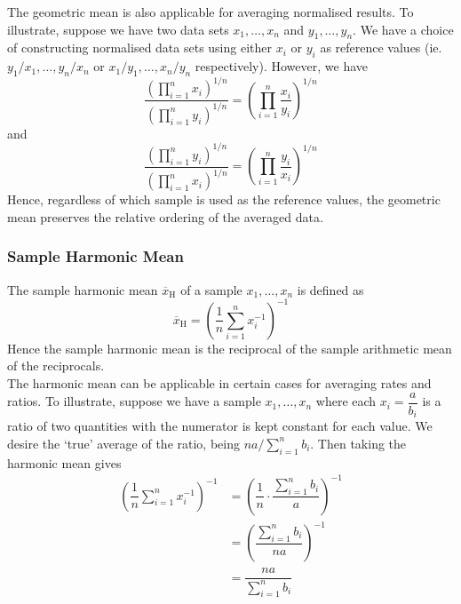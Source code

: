 \documentclass[11pt]{report} %
\begin{document}
The geometric mean is also applicable for averaging normalised results. To illustrate, suppose we have two data sets $x_{1}, \dots, x_{n}$ and $y_{1}, \dots, y_{n}$. We have a choice of constructing normalised data sets using either $x_{i}$ or $y_{i}$ as reference values (ie. $y_{1}/x_{1}, \dots, y_{n}/x_{n}$ or $x_{1}/y_{1}, \dots, x_{n}/y_{n}$ respectively). However, we have
\begin{equation}
\dfrac{\left(\prod_{i = 1}^{n}x_{i}\right)^{1/n}}{\left(\prod_{i = 1}^{n}y_{i}\right)^{1/n}} = \left(\prod_{i = 1}^{n}\dfrac{x_{i}}{y_{i}}\right)^{1/n}
\end{equation}
and
\begin{equation}
\dfrac{\left(\prod_{i = 1}^{n}y_{i}\right)^{1/n}}{\left(\prod_{i = 1}^{n}x_{i}\right)^{1/n}} = \left(\prod_{i = 1}^{n}\dfrac{y_{i}}{x_{i}}\right)^{1/n}
\end{equation}
Hence, regardless of which sample is used as the reference values, the geometric mean preserves the relative ordering of the averaged data.

\subsubsection{Sample Harmonic Mean}

The sample harmonic mean $\overline{x}_{\mathrm{H}}$ of a sample $x_{1}, \dots, x_{n}$ is defined as
\begin{equation}
\overline{x}_{\mathrm{H}} = \left(\dfrac{1}{n}\sum_{i = 1}^{n}x_{i}^{-1}\right)^{-1}
\end{equation}
Hence the sample harmonic mean is the reciprocal of the sample arithmetic mean of the reciprocals. \\

The harmonic mean can be applicable in certain cases for averaging rates and ratios. To illustrate, suppose we have a sample $x_{1}, \dots, x_{n}$ where each $x_{i} = \dfrac{a}{b_{i}}$ is a ratio of two quantities with the numerator is kept constant for each value. We desire the `true' average of the ratio, being $na/\sum_{i = 1}^{n}b_{i}$. Then taking the harmonic mean gives
\begin{align}
\left(\dfrac{1}{n}\sum_{i = 1}^{n}x_{i}^{-1}\right)^{-1} &= \left(\dfrac{1}{n}\cdot\dfrac{\sum_{i = 1}^{n}b_{i}}{a}\right)^{-1} \\
&= \left(\dfrac{\sum_{i = 1}^{n}b_{i}}{na}\right)^{-1} \\
&= \dfrac{na}{\sum_{i = 1}^{n}b_{i}}
\end{align}
\end{document}
